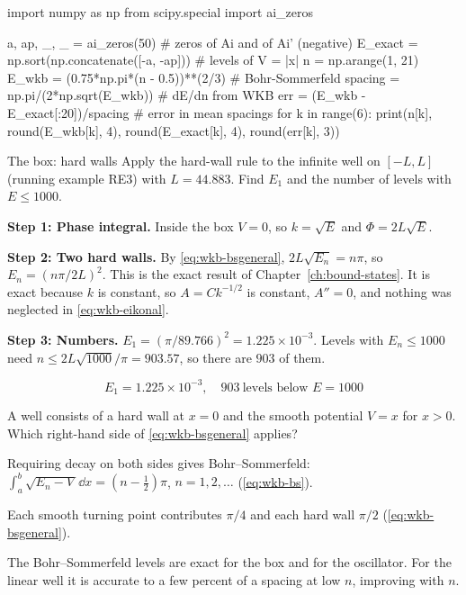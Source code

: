 \begin{pycode}
import numpy as np
from scipy.special import ai_zeros

a, ap, _, _ = ai_zeros(50)            # zeros of Ai and of Ai' (negative)
E_exact = np.sort(np.concatenate([-a, -ap]))   # levels of V = |x|
n = np.arange(1, 21)
E_wkb = (0.75*np.pi*(n - 0.5))**(2/3)          # Bohr-Sommerfeld
spacing = np.pi/(2*np.sqrt(E_wkb))             # dE/dn from WKB
err = (E_wkb - E_exact[:20])/spacing           # error in mean spacings
for k in range(6):
    print(n[k], round(E_wkb[k], 4), round(E_exact[k], 4), round(err[k], 3))
\end{pycode}

\begin{sample}{The box: hard walls}
Apply the hard-wall rule to the infinite well on $[-L,L]$ (running example RE3) with $L=44.883$. Find $E_1$ and the number of levels with $E\le1000$.

\textbf{Step 1: Phase integral.} Inside the box $V=0$, so $k=\sqrt E$ and $\Phi=2L\sqrt E$.

\textbf{Step 2: Two hard walls.} By \cref{eq:wkb-bsgeneral}, $2L\sqrt{E_n}=n\pi$, so $E_n=(n\pi/2L)^2$. This is the exact result of Chapter~\ref{ch:bound-states}. It is exact because $k$ is constant, so $A=Ck^{-1/2}$ is constant, $A''=0$, and nothing was neglected in \cref{eq:wkb-eikonal}.

\textbf{Step 3: Numbers.} $E_1=(\pi/89.766)^2=1.225\times10^{-3}$. Levels with $E_n\le1000$ need $n\le2L\sqrt{1000}/\pi=903.57$, so there are $903$ of them.

\[
\boxed{E_1=1.225\times10^{-3},\quad 903\ \text{levels below }E=1000}
\]
\end{sample}

\begin{checkpoint}
A well consists of a hard wall at $x=0$ and the smooth potential $V=x$ for $x>0$. Which right-hand side of \cref{eq:wkb-bsgeneral} applies?
\end{checkpoint}

\begin{keyideas}
\item Requiring decay on both sides gives Bohr--Sommerfeld: $\int_a^b\sqrt{E_n-V}\,\dd x=(n-\frac12)\pi$, $n=1,2,\dots$ (\cref{eq:wkb-bs}).
\item Each smooth turning point contributes $\pi/4$ and each hard wall $\pi/2$ (\cref{eq:wkb-bsgeneral}).
\item The Bohr--Sommerfeld levels are exact for the box and for the oscillator. For the linear well it is accurate to a few percent of a spacing at low $n$, improving with $n$.
\end{keyideas}

